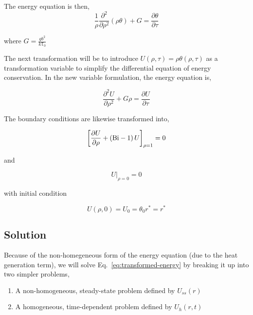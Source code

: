 The energy equation is then,
\begin{equation}
    \frac{1}{\rho}\frac{\partial^2}{\partial \rho^2}(\rho\theta) + G = \frac{\partial\theta}{\partial \tau}
\end{equation}

where $G = \frac{gb^2}{k\mathbb{T}_0}$

The next transformation will be to introduce $U(\rho,\tau) = \rho\theta(\rho,\tau)$ as a transformation variable to simplify the differential equation of energy conservation. In the new variable formulation, the energy equation is,

\begin{equation}\label{eq:transformed-energy}
    \frac{\partial^2 U}{\partial \rho^2} + G\rho = \frac{\partial U}{\partial \tau}
\end{equation}

The boundary conditions are likewise transformed into,

\begin{equation}\label{eq:transformed-bc-1}
    \left[\frac{\partial U}{\partial \rho} + \left(\mathrm{Bi}-1\right)U\right]_{\rho = 1}= 0
\end{equation}

and

\begin{equation}\label{eq:transformed-bc-2}
    U\big|_{\rho=0} = 0
\end{equation}

with initial condition

\begin{equation}\label{eq:transformed-ic}
    U(\rho,0) = U_0 = \theta_0 r^* = r^*
\end{equation}




\subsection{Solution}

Because of the non-homegeneous form of the energy equation (due to the heat generation term), we will solve Eq.~\ref{eq:transformed-energy} by breaking it up into two simpler problems, 

\begin{enumerate}
\item A non-homogeneous, steady-state problem defined by $U_{ss}(r)$
\item A homogeneous, time-dependent problem defined by $U_h(r,t)$
\end{enumerate}

